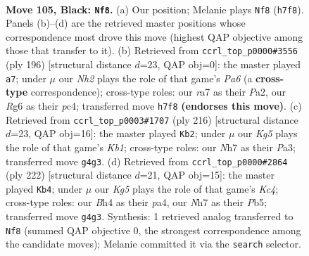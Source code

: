 \documentclass[11pt]{article}
\begin{document}
\clearpage

\begin{figure}[p]\centering
\begin{subfigure}{0.46\textwidth}\centering
\resizebox{\linewidth}{!}{%
\newchessgame
\chessboard[
  setfen={8/R6n/6rp/4p3/6kb/1K1p4/8/8 b - - 7 105},
  showmover=false,
  pgfstyle=straightmove, color=movearrow, markmove={h7-f8}
]}
\caption{}
\end{subfigure}\hfill
\begin{subfigure}{0.46\textwidth}\centering
\resizebox{\linewidth}{!}{%
\newchessgame
\chessboard[
  setfen={8/6R1/P4K2/7k/2p5/6P1/P7/8 w - - 0 99},
  showmover=false,
  pgfstyle=straightmove, color=movearrow, markmove={a6-a7}
]}
\caption{}
\end{subfigure}
\\[4pt]
\begin{subfigure}{0.46\textwidth}\centering
\resizebox{\linewidth}{!}{%
\newchessgame
\chessboard[
  setfen={1R6/8/k7/8/7P/P1r5/8/1K6 w - - 1 109},
  showmover=false,
  pgfstyle=straightmove, color=movearrow, markmove={b1-b2}
]}
\caption{}
\end{subfigure}\hfill
\begin{subfigure}{0.46\textwidth}\centering
\resizebox{\linewidth}{!}{%
\newchessgame
\chessboard[
  setfen={1r6/8/8/1P4k1/p1KR4/P5p1/8/8 w - - 0 112},
  showmover=false,
  pgfstyle=straightmove, color=movearrow, markmove={c4-b4}
]}
\caption{}
\end{subfigure}
\caption{\textbf{Move 105, Black: \texttt{Nf8}.} (a) Our position; Melanie plays \texttt{Nf8} (\texttt{h7f8}). Panels (b)--(d) are the retrieved master positions whose correspondence most drove this move (highest QAP objective among those that transfer to it). (b) Retrieved from \texttt{ccrl\_top\_p0000\#3556} (ply 196) [structural distance $d$=23, QAP obj=0]: the master played \texttt{a7}; under $\mu$ our \emph{Nh2} plays the role of that game's \emph{Pa6} (a \textbf{cross-type} correspondence); cross-type roles: our \emph{r}a7 as their \emph{P}a2, our \emph{R}g6 as their \emph{p}c4; transferred move \texttt{h7f8} \textbf{(endorses this move)}. (c) Retrieved from \texttt{ccrl\_top\_p0003\#1707} (ply 216) [structural distance $d$=23, QAP obj=16]: the master played \texttt{Kb2}; under $\mu$ our \emph{Kg5} plays the role of that game's \emph{Kb1}; cross-type roles: our \emph{N}h7 as their \emph{P}a3; transferred move \texttt{g4g3}. (d) Retrieved from \texttt{ccrl\_top\_p0000\#2864} (ply 222) [structural distance $d$=21, QAP obj=15]: the master played \texttt{Kb4}; under $\mu$ our \emph{Kg5} plays the role of that game's \emph{Kc4}; cross-type roles: our \emph{B}h4 as their \emph{p}a4, our \emph{N}h7 as their \emph{P}b5; transferred move \texttt{g4g3}. Synthesis: 1 retrieved analog transferred to \texttt{Nf8} (summed QAP objective 0, the strongest correspondence among the candidate moves); Melanie committed it via the \texttt{search} selector.}
\label{fig:thought-m209}
\end{figure}
\end{document}

